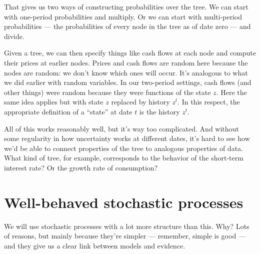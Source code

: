 \documentclass[11pt]{article}
\begin{document}
That gives us two ways of constructing probabilities over the tree.
We can start with one-period probabilities and multiply.
Or we can start with multi-period probabilities
--- the probabilities of every node in the tree as of date zero --- and divide.

Given a tree, we can then specify things like cash flows at each node
and compute their prices at earlier nodes.
Prices and cash flows are random here because the nodes are random:  we don't
know which ones will occur.
It's analogous to what we did earlier with random variables.
In our two-period settings, cash flows (and other things)
were random because they were functions of the state $z$.
Here the same idea applies but with state $z$ replaced by history $z^t$.
In this respect, the appropriate definition of a ``state'' at date $t$ is
the history $z^t$.

All of this works reasonably well, but it's way too complicated.
And without some regularity in how uncertainty works at different dates,
it's hard to see how we'd be able to connect properties of the tree
to analogous properties of data.
What kind of tree, for example, corresponds to the behavior of the short-term
interest rate?  Or the growth rate of consumption?



\section{Well-behaved stochastic processes}
\label{sec:markov}


We will use stochastic processes with a lot more structure
than this.
Why?  Lots of reasons, but mainly because they're simpler
--- remember, simple is good ---
and they give us a clear link between models and evidence.
\end{document}
